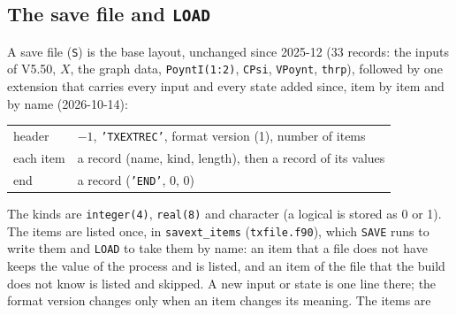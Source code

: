 \documentclass[11pt]{article}
\begin{document}
\subsection{The save file and \texttt{LOAD}}
\label{sec:savefile}

A save file (\texttt{S}) is the base layout, unchanged since 2025-12 (33 records: the
inputs of V5.50, $X$, the graph data, \texttt{PoyntI(1:2)}, \texttt{CPsi}, \texttt{VPoynt},
\texttt{thrp}), followed by one extension that carries every input and every state added
since, item by item and by name (2026-10-14):
\begin{center}
\begin{tabular}{|l|l|}\hline
header & $-1$, \texttt{'TXEXTREC'}, format version (1), number of items \\
each item & a record (name, kind, length), then a record of its values \\
end & a record (\texttt{'END'}, 0, 0) \\\hline
\end{tabular}
\end{center}
The kinds are \texttt{integer(4)}, \texttt{real(8)} and character (a logical is stored as
0 or 1).  The items are listed once, in \texttt{savext\_items} (\texttt{txfile.f90}), which
\texttt{SAVE} runs to write them and \texttt{LOAD} to take them by name: an item that a file
does not have keeps the value of the process and is listed, and an item of the file that the
build does not know is listed and skipped.  A new input or state is one line there; the format
version changes only when an item changes its meaning.  The items are
\end{document}
